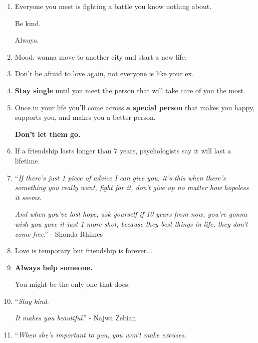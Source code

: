 \documentclass{article}
\numberwithin{equation}{section}
\begin{document}
\begin{enumerate}
    \textit{Worrying won't make it any better}.
    
    \textit{If you want to be successful, respect 1 rule}.
    
    \textbf{\textit{Never let failure take control of you}.}
    
    \textit{Everybody has gone through something that has changed them in a way that they could never go back to person they once were}.
    
    \textit{Relationships are like electric currents, \textbf{wrong connection will give you shock throughout your life.}}
    
    \textbf{\textit{But the right one will light up your life}.}'' - Leonardo Dicaprio
    \item Everyone you meet is fighting a battle you know nothing about.
    
    Be kind.
    
    Always.
    \item Mood: wanna move to another city and start a new life.
    \item Don't be afraid to love again, not everyone is like your ex.
    \item \textbf{Stay single} until you meet the person that will take care of you the most.
    \item Once in your life you'll come across \textbf{a special person} that makes you happy, supports you, and makes you a better person.
    
    \textbf{Don't let them go.}
    \item If a friendship lasts longer than 7 years, psychologists say it will last a lifetime.
    \item ``\textit{If there's just 1 piece of advice I can give you, it's this when there's something you really want, fight for it, don't give up no matter how hopeless it seems}.
    
    \textit{And when you've lost hope, ask yourself if 10 years from now, you're gonna wish you gave it just 1 more shot, because they best things in life, they don't come free}.'' - Shonda Rhimes
    \item Love is temporary but friendship is forever$\ldots$
    \item \textbf{Always help someone.}
    
    You might be the only one that does.
    \item ``\textit{Stay kind}.
    
    \textit{It makes you beautiful}.'' - Najwa Zebian
    \item ``\textit{When she's important to you, you won't make excuses}.
    

\end{enumerate}
\end{document}
